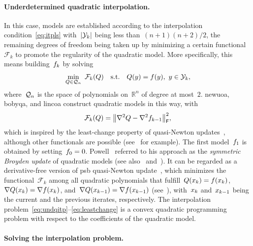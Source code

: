 \documentclass[manuscript,screen,review]{acmart}
\numberwithin{equation}{section}
\newcommand*{\R}{\mathbb{R}}
\newcommand*{\abs}[2][]{#1\lvert#2#1\rvert}
\newcommand*{\frob}{\mathsf{F}}
\newcommand*{\func}{\mathcal{F}}
\newcommand*{\iter}[1][k]{x\ifthenelse{\equal{#1}{}}{}{_{#1}}}
\newcommand*{\norm}[2][]{#1\lVert#2#1\rVert}
\newcommand*{\objm}[1][k]{\obj\ifthenelse{\equal{#1}{}}{}{_{#1}}}
\newcommand*{\obj}{f}
\newcommand*{\qspace}[1][n]{\mathcal{Q}\ifthenelse{\equal{#1}{}}{}{_{#1}}}
\newcommand*{\st}{\text{s.t.}}
\newcommand*{\xpt}[1][k]{\mathcal{Y}\ifthenelse{\equal{#1}{}}{}{_{#1}}}
\begin{document}
\paragraph{\textnormal{\textbf{Underdetermined quadratic interpolation.}}}

In this case, models are established according to the interpolation condition~\eqref{eq:itpls} with~$\abs{\xpt}$ being less than~$(n + 1)(n + 2) / 2$, the remaining degrees of freedom being taken up by minimizing a certain functional~$\func_k$ to promote the regularity of the quadratic model.
More specifically, this means building~$\objm$ by solving
\begin{equation}
    \label{eq:undqitp}
        \min_{Q \in \qspace} ~ \func_k(Q) \quad \st \quad Q(y) = \obj(y), ~ y \in \xpt,
\end{equation}
where~$\qspace$ is the space of polynomials on~$\R^n$ of degree at most~$2$.
\Gls{newuoa}, \gls{bobyqa}, and \gls{lincoa} construct quadratic models in this way, with
\begin{equation}
    \label{eq:leastchange}
    \func_k(Q) = \norm[\big]{\nabla^2 Q - \nabla^2 \objm[k - 1]}_{\frob}^2,
\end{equation}
which is inspired by the least-change property of quasi-Newton updates~\cite{Dennis_Schnabel_1979}, although other functionals are possible (see~\cite{Conn_Toint_1996,Bandeira_Scheinberg_Vicente_2012,Powell_2013,Zhang_2014,Xie_Yuan_2023} for example).
The first model~$\objm[1]$ is obtained by setting~$\objm[0] = 0$.
Powell~\cite{Powell_2013} referred to his approach as the \emph{symmetric Broyden update} of quadratic models (see also~\cite[\S~3.6]{Zhang_2012} and~\cite[\S~2.4.2]{Ragonneau_2022}).
It can be regarded as a derivative-free version of \gls{psb} quasi-Newton update~\cite{Powell_1970b}, which minimizes the functional~$\func_k$ among all quadratic polynomials that fulfill~$Q(\iter) = \obj(\iter)$, $\nabla Q(\iter) = \nabla \obj(\iter)$, and~$\nabla Q(\iter[k - 1]) = \nabla \obj(\iter[k - 1])$ (see~\cite[Theorem~4.2]{Dennis_Schnabel_1979}), with~$\iter$ and~$\iter[k - 1]$ being the current and the previous iterates, respectively.
The interpolation problem~\mbox{\eqref{eq:undqitp}--\eqref{eq:leastchange}} is a convex quadratic programming problem with respect to the coefficients of the quadratic model.

\paragraph{\textnormal{\textbf{Solving the interpolation problem.}}}
\end{document}
